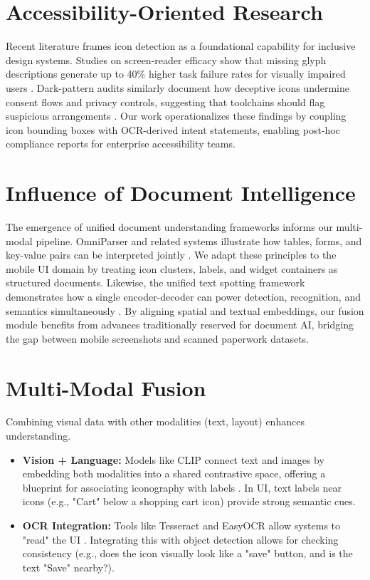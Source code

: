 \documentclass[11pt,a4paper]{report}
\begin{document}
\section{Accessibility-Oriented Research}
Recent literature frames icon detection as a foundational capability for inclusive design systems. Studies on screen-reader efficacy show that missing glyph descriptions generate up to 40\% higher task failure rates for visually impaired users \cite{multimodalaccessibility}. Dark-pattern audits similarly document how deceptive icons undermine consent flows and privacy controls, suggesting that toolchains should flag suspicious arrangements \cite{darkpatterns}. Our work operationalizes these findings by coupling icon bounding boxes with OCR-derived intent statements, enabling post-hoc compliance reports for enterprise accessibility teams.

\section{Influence of Document Intelligence}
The emergence of unified document understanding frameworks informs our multi-modal pipeline. OmniParser and related systems illustrate how tables, forms, and key-value pairs can be interpreted jointly \cite{omniparser}. We adapt these principles to the mobile UI domain by treating icon clusters, labels, and widget containers as structured documents. Likewise, the unified text spotting framework demonstrates how a single encoder-decoder can power detection, recognition, and semantics simultaneously \cite{unifiedtext}. By aligning spatial and textual embeddings, our fusion module benefits from advances traditionally reserved for document AI, bridging the gap between mobile screenshots and scanned paperwork datasets.

\section{Multi-Modal Fusion}
Combining visual data with other modalities (text, layout) enhances understanding.
\begin{itemize}
    \item \textbf{Vision + Language:} Models like CLIP connect text and images by embedding both modalities into a shared contrastive space, offering a blueprint for associating iconography with labels \cite{clip}. In UI, text labels near icons (e.g., "Cart" below a shopping cart icon) provide strong semantic cues.
    \item \textbf{OCR Integration:} Tools like Tesseract and EasyOCR allow systems to "read" the UI \cite{tesseract} \cite{easyocr}. Integrating this with object detection allows for checking consistency (e.g., does the icon visually look like a "save" button, and is the text "Save" nearby?).
\end{itemize}
\end{document}
